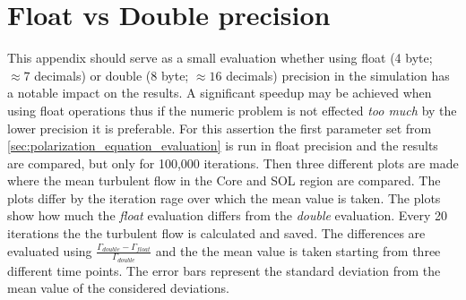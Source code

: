 \documentclass[master.tex]{subfiles}
\begin{document}
\chapter{Float vs Double precision} \label{sec:float-vs-double}
\renewcommand{\thechapter}{A}
This appendix should serve as a small evaluation whether using float (4 byte; $\approx 7$ decimals) or double (8 byte; $\approx 16$ decimals) precision in the simulation has a notable impact on the results. A significant speedup may be achieved when using float operations thus if the numeric problem is not effected \textit{too much} by the lower precision it is preferable.\newline
For this assertion the first parameter set from \autoref{sec:polarization_equation_evaluation} is run in float precision and the results are compared, but only for 100,000 iterations. Then three different plots are made where the mean turbulent flow in the Core and \ac{SOL} region are compared. The plots differ by the iteration rage over which the mean value is taken. The plots show how much the \textit{float} evaluation differs from the \textit{double} evaluation. Every 20 iterations the the turbulent flow is calculated and saved. The differences are evaluated using $\frac{\Gamma_{double} - \Gamma_{float}}{\Gamma_{double}}$ and the the mean value is taken starting from three different time points. The error bars represent the standard deviation from the mean value of the considered deviations. 
\end{document}
